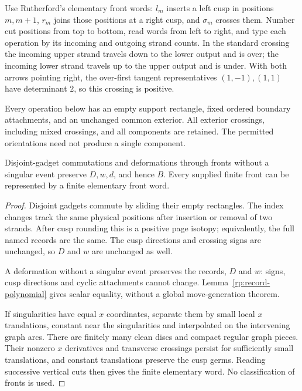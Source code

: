 Use Rutherford's elementary front words: $l_m$ inserts a left cusp in
positions $m,m+1$, $r_m$ joins those positions at a right cusp, and
$\sigma_m$ crosses them. Number cut positions from top to bottom, read
words from left to right, and type each operation by its incoming and
outgoing strand counts. In the standard crossing the incoming upper
strand travels down to the lower output and is over; the incoming lower
strand travels up to the upper output and is under. With both arrows
pointing right, the over-first tangent representatives $(1,-1),(1,1)$
have determinant $2$, so this crossing is positive.

Every operation below has an empty support rectangle, fixed ordered
boundary attachments, and an unchanged common exterior. All exterior
crossings, including mixed crossings, and all components are retained.
The permitted orientations need not produce a single component.

\begin{lemma}
\label{ng:commutation}
Disjoint-gadget commutations and deformations through fronts without a
singular event preserve $D,w,d$, and hence $B$. Every supplied finite
front can be represented by a finite elementary front word.
\end{lemma}
\begin{proof}
Disjoint gadgets commute by sliding their empty rectangles. The index
changes track the same physical positions after insertion or removal of
two strands. After cusp rounding this is a positive page isotopy;
equivalently, the full named records are the same. The cusp directions
and crossing signs are unchanged, so $D$ and $w$ are unchanged as well.

A deformation without a singular event preserves the records, $D$ and
$w$: signs, cusp directions and cyclic attachments cannot change.
Lemma~\ref{rp:record-polynomial} gives scalar equality, without a global
move-generation theorem.

If singularities have equal $x$ coordinates, separate them by small local
$x$ translations, constant near the singularities and interpolated on
the intervening graph arcs. There are finitely many clean discs and
compact regular graph pieces. Their nonzero $x$ derivatives and
transverse crossings persist for sufficiently small translations, and
constant translations preserve the cusp germs. Reading successive
vertical cuts then gives the finite elementary word. No classification
of fronts is used.
\end{proof}

